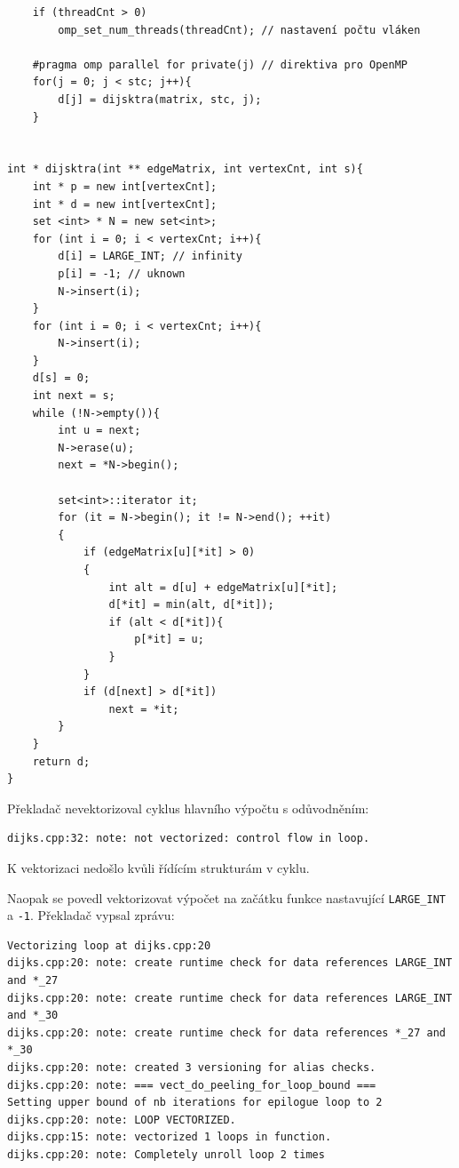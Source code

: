\documentclass[10pt,a4paper]{article}
\begin{document}
\begin{verbatim}
    if (threadCnt > 0)
        omp_set_num_threads(threadCnt); // nastavení počtu vláken

    #pragma omp parallel for private(j) // direktiva pro OpenMP
    for(j = 0; j < stc; j++){
        d[j] = dijsktra(matrix, stc, j);
    }


int * dijsktra(int ** edgeMatrix, int vertexCnt, int s){
    int * p = new int[vertexCnt];
    int * d = new int[vertexCnt];
    set <int> * N = new set<int>;
    for (int i = 0; i < vertexCnt; i++){
        d[i] = LARGE_INT; // infinity
        p[i] = -1; // uknown
        N->insert(i);
    }
    for (int i = 0; i < vertexCnt; i++){
        N->insert(i);
    }   
    d[s] = 0;
    int next = s;
    while (!N->empty()){
        int u = next;
        N->erase(u);
        next = *N->begin();

        set<int>::iterator it;
        for (it = N->begin(); it != N->end(); ++it)
        {
            if (edgeMatrix[u][*it] > 0)
            {
                int alt = d[u] + edgeMatrix[u][*it];
                d[*it] = min(alt, d[*it]);
                if (alt < d[*it]){
                    p[*it] = u;
                }
            }
            if (d[next] > d[*it])
                next = *it;
        }
    }
    return d;
}
\end{verbatim}

Překladač nevektorizoval cyklus hlavního výpočtu s odůvodněním:
\begin{verbatim}
dijks.cpp:32: note: not vectorized: control flow in loop.
\end{verbatim}

K vektorizaci nedošlo kvůli řídícím strukturám v cyklu. 

Naopak se povedl vektorizovat výpočet na začátku funkce nastavující \texttt{LARGE\_INT} a \texttt{-1}. Překladač vypsal zprávu:

\begin{verbatim}
Vectorizing loop at dijks.cpp:20
dijks.cpp:20: note: create runtime check for data references LARGE_INT and *_27
dijks.cpp:20: note: create runtime check for data references LARGE_INT and *_30
dijks.cpp:20: note: create runtime check for data references *_27 and *_30
dijks.cpp:20: note: created 3 versioning for alias checks.
dijks.cpp:20: note: === vect_do_peeling_for_loop_bound ===
Setting upper bound of nb iterations for epilogue loop to 2
dijks.cpp:20: note: LOOP VECTORIZED.
dijks.cpp:15: note: vectorized 1 loops in function.
dijks.cpp:20: note: Completely unroll loop 2 times
\end{verbatim}
\end{document}
